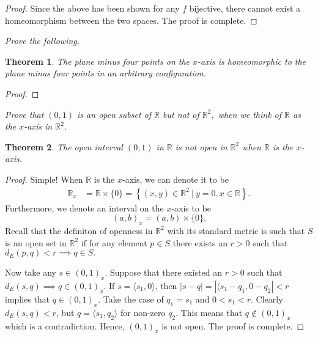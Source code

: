 \documentclass[letter]{article}
\newtheorem{theorem}{Theorem}
\newenvironment{menumerate}{%
  \edef\backupindent{\the\parindent}%
  \enumerate%
  \setlength{\parindent}{\backupindent}%
}{\endenumerate}
\begin{document}
\begin{menumerate}
\begin{proof}
			Since the above has been shown for any $f$ bijective, there cannot exist a homeomorphism between the two spaces. The proof is complete.
		\end{proof}


		\setcounter{enumi}{20}
		\item \emph{Prove the following.}
			\begin{theorem}
				The plane minus four points on the $x$-axis is homeomorphic to the plane minus four points in an arbitrary configuration.
			\end{theorem}
			\begin{proof}
			
			\end{proof}
		\item
		\item \textit{Prove that $(0,1)$ is an open subset of $\mathbb{R}$ but 
			not of $\mathbb{R}^2,$ when we think of $\mathbb{R}$ as the $x$-axis in $\mathbb {R}^2$.} 
			\begin{theorem}
				The open interval $(0,1)$ in $\mathbb{R}$ is not open in $\mathbb{R}^2$ when $\mathbb{R}$ is the $x$-axis.
			\end{theorem}
			\begin{proof}
				Simple! When $\mathbb{R}$ is the $x$-axis, we can denote it to be 
				\begin{equation}
					\begin{aligned}
						\mathbb{R}_x &=  \mathbb{R} \times \{0\} 
							= \left\{(x,y) \in \mathbb{R}^2\ | \ y = 0, x \in \mathbb{R} \right\}.
					\end{aligned}
				\end{equation}
				Furthermore, we denote an interval on the $x$-axis to be 
				\begin{equation}
					(a,b)_x = (a,b) \times \{0\}.
				\end{equation}
				Recall that the definiton of openness in $\mathbb{R}^2$ with its standard metric is such that $S$ is an open set in $\mathbb{R}^2$ if for any element $p\in S$ there exists an $r > 0$ such that $d_E(p,q) <r \implies q \in S.$ 

				Now take any $s \in (0,1)_x.$ Suppose that there existed an $r >0$ such that $d_E(s,q) \implies q \in (0,1)_x$. If $s = \langle s_1, 0 \rangle$, then $|s - q| =  |\langle s_1 - q_1, 0 - q_2| < r$ implies that $q \in (0,1)_x$. Take the case of $q_1 = s_1$ and $0 < s_1 < r$. Clearly $d_E(s,q) < r$, but $q = \langle s_1, q_2 \rangle$ for non-zero $q_2$. This means that $q\notin (0,1)_x$ which is a contradiction. Hence, $(0,1)_x$ is not open. The proof is complete.
			\end{proof}



\end{menumerate}
\end{document}
